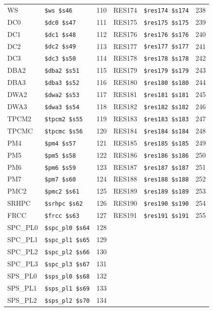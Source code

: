 \begin{table}
\begin{center}
{\begin{tabular}{|l|l|l||l|l|l|}
WS & \verb|$ws $s46| & 110 &
RES174 & \verb|$res174 $s174| & 238 \\
DC0 & \verb|$dc0 $s47| & 111 &
RES175 & \verb|$res175 $s175| & 239 \\
DC1 & \verb|$dc1 $s48| & 112 &
RES176 & \verb|$res176 $s176| & 240 \\
DC2 & \verb|$dc2 $s49| & 113 &
RES177 & \verb|$res177 $s177| & 241 \\
DC3 & \verb|$dc3 $s50| & 114 &
RES178 & \verb|$res178 $s178| & 242 \\
DBA2 & \verb|$dba2 $s51| & 115 &
RES179 & \verb|$res179 $s179| & 243 \\
DBA3 & \verb|$dba3 $s52| & 116 &
RES180 & \verb|$res180 $s180| & 244 \\
DWA2 & \verb|$dwa2 $s53| & 117 &
RES181 & \verb|$res181 $s181| & 245 \\
DWA3 & \verb|$dwa3 $s54| & 118 &
RES182 & \verb|$res182 $s182| & 246 \\
TPCM2 & \verb|$tpcm2 $s55| & 119 &
RES183 & \verb|$res183 $s183| & 247 \\
TPCMC & \verb|$tpcmc $s56| & 120 &
RES184 & \verb|$res184 $s184| & 248 \\
PM4 & \verb|$pm4 $s57| & 121 &
RES185 & \verb|$res185 $s185| & 249 \\
PM5 & \verb|$pm5 $s58| & 122 &
RES186 & \verb|$res186 $s186| & 250 \\
PM6 & \verb|$pm6 $s59| & 123 &
RES187 & \verb|$res187 $s187| & 251 \\
PM7 & \verb|$pm7 $s60| & 124 &
RES188 & \verb|$res188 $s188| & 252 \\
PMC2 & \verb|$pmc2 $s61| & 125 &
RES189 & \verb|$res189 $s189| & 253 \\
SRHPC & \verb|$srhpc $s62| & 126 &
RES190 & \verb|$res190 $s190| & 254 \\
FRCC & \verb|$frcc $s63| & 127 &
RES191 & \verb|$res191 $s191| & 255 \\
SPC_PL0 & \verb|$spc_pl0 $s64| & 128 &
 & \verb|| &  \\
SPC_PL1 & \verb|$spc_pl1 $s65| & 129 &
 & \verb|| &  \\
SPC_PL2 & \verb|$spc_pl2 $s66| & 130 &
 & \verb|| &  \\
SPC_PL3 & \verb|$spc_pl3 $s67| & 131 &
 & \verb|| &  \\
SPS_PL0 & \verb|$sps_pl0 $s68| & 132 &
 & \verb|| &  \\
SPS_PL1 & \verb|$sps_pl1 $s69| & 133 &
 & \verb|| &  \\
SPS_PL2 & \verb|$sps_pl2 $s70| & 134 &

\end{tabular}}
\end{center}
\end{table}
